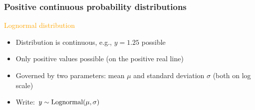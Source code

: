 \documentclass[dvipsnames]{beamer}
\begin{document}
\begin{frame}
 \frametitle{Positive continuous probability distributions}
 \begin{center}
 \textcolor{Orange}{Lognormal distribution}
 \end{center}

 \begin{itemize}
  \item<only@2> Distribution is continuous, e.g., $y = 1.25$ possible
  \item Only positive values possible (on the positive real line)
  \item Governed by two parameters: mean $\mu$ and standard deviation $\sigma$ (both on log scale)
  \item Write: $y \sim \textnormal{Lognormal}(\mu, \sigma)$
 \end{itemize}
\end{frame}
\end{document}
